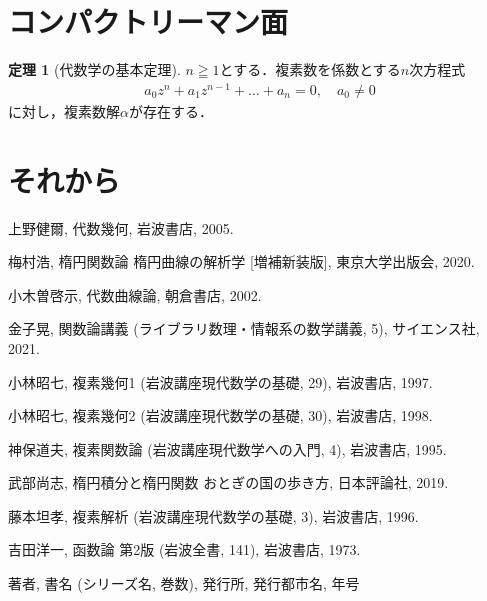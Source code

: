 \documentclass[11pt, a4paper, dvipdfmx, draft]{jsarticle}
\theoremstyle{definition}
\newtheorem{Theorem}[Axiom]{定理}
\theoremstyle{mystyle}
\begin{document}
\section{コンパクトリーマン面}

\begin{Theorem}[代数学の基本定理{\cite[系2.24]{ogs}}]
    $n\geqq1$とする．複素数を係数とする$n$次方程式
    \begin{align*}
        a_{0}z^{n}+a_{1}z^{n-1}+\dots +a_{n}=0,\quad a_{0}\neq 0
    \end{align*}
    に対し，複素数解$\alpha$が存在する．
\end{Theorem}

\section{それから}

\begin{thebibliography}{15}

     上野健爾, 代数幾何, 岩波書店, 2005.

     梅村浩, 楕円関数論 楕円曲線の解析学 [増補新装版], 東京大学出版会, 2020.

     小木曽啓示, 代数曲線論, 朝倉書店, 2002.

     金子晃, 関数論講義 (ライブラリ数理・情報系の数学講義, 5), サイエンス社, 2021.

     小林昭七, 複素幾何1 (岩波講座現代数学の基礎, 29), 岩波書店, 1997.

     小林昭七, 複素幾何2 (岩波講座現代数学の基礎, 30), 岩波書店, 1998.

     神保道夫, 複素関数論 (岩波講座現代数学への入門, 4), 岩波書店, 1995.

     武部尚志, 楕円積分と楕円関数 おとぎの国の歩き方, 日本評論社, 2019.

     藤本坦孝, 複素解析 (岩波講座現代数学の基礎, 3), 岩波書店, 1996.

     吉田洋一, 函数論 第2版 (岩波全書, 141), 岩波書店, 1973.

     著者, 書名 (シリーズ名, 巻数), 発行所, 発行都市名, 年号
\end{thebibliography}
\end{document}
